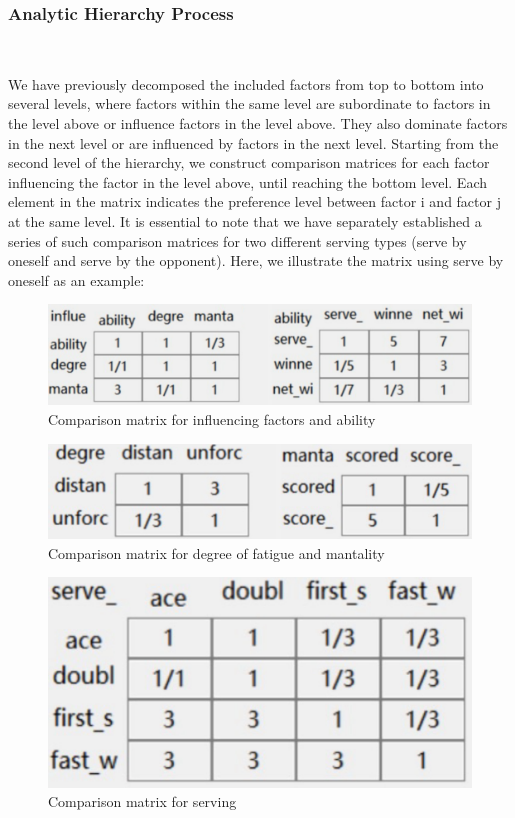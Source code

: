 \subsubsection{Analytic Hierarchy Process}~{}

We have previously decomposed the included factors from top to bottom into several levels, 
where factors within the same level are subordinate to factors in the level above or influence 
factors in the level above. They also dominate factors in the next level or are influenced by 
factors in the next level. Starting from the second level of the hierarchy, we construct 
comparison matrices for each factor influencing the factor in the level above, until reaching 
the bottom level. Each element in the matrix indicates the preference level between factor i and 
factor j at the same level. It is essential to note that we have separately established a series 
of such comparison matrices for two different serving types (serve by oneself and serve by 
the opponent). Here, we illustrate the matrix using serve by oneself as an example:

\begin{figure}[H]
    \centering
    \includegraphics[scale=0.06]{mainmatter/imgs/2.jpg}
    \caption{Comparison matrix for influencing factors and ability}
\end{figure}
\begin{figure}[H]
    \centering
    \includegraphics[scale=0.05]{mainmatter/imgs/3.jpg}
    \caption{Comparison matrix for degree of fatigue and mantality}
\end{figure}
\begin{figure}[H]
    \centering
    \includegraphics[scale=0.06]{mainmatter/imgs/4.jpg}
    \caption{Comparison matrix for serving}
\end{figure}

